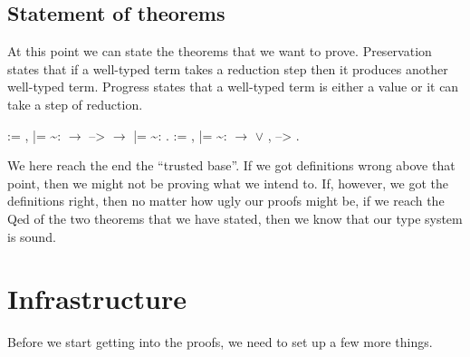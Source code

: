 \documentclass[12pt]{report}
\begin{document}
\subsection{Statement of theorems}



 At this point we can state the theorems that we want to prove.
    Preservation states that if a well-typed term takes a reduction
    step then it produces another well-typed term.
    Progress states that a well-typed term is either a value or it 
    can take a step of reduction. 

\begin{coqdoccode}
\coqdocemptyline
\coqdocnoindent
{}  := \coqdockw{\ensuremath{\forall}}    ,\coqdoceol
\coqdocindent{1.00em}
 |=  \~{}:  \ensuremath{\rightarrow}\coqdoceol
\coqdocindent{1.00em}
 -->  \ensuremath{\rightarrow}\coqdoceol
\coqdocindent{1.00em}
 |=  \~{}: .\coqdoceol
\coqdocemptyline
\coqdocnoindent
{}  := \coqdockw{\ensuremath{\forall}}  , \coqdoceol
\coqdocindent{1.00em}
 |=  \~{}:  \ensuremath{\rightarrow}\coqdoceol
\coqdocindent{2.50em}
  \coqdoceol
\coqdocindent{1.00em}
\ensuremath{\lor} \coqdoctac{\ensuremath{\exists}} ,  --> .\coqdoceol
\coqdocemptyline
\end{coqdoccode}
We here reach the end the ``trusted base''. If we got definitions wrong
    above that point, then we might not be proving what we intend to.
    If, however, we got the definitions right, then no matter how ugly
    our proofs might be, if we reach the Qed of the two theorems that
    we have stated, then we know that our type system is sound.

\begin{coqdoccode}
\coqdocemptyline
\end{coqdoccode}
\section{Infrastructure}



 Before we start getting into the proofs, we need to set up a few
    more things.
\end{document}
